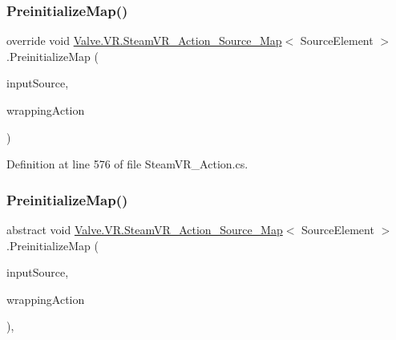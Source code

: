 \subsubsection{\texorpdfstring{PreinitializeMap()}{PreinitializeMap()}\hspace{0.1cm}{\footnotesize\ttfamily [1/2]}}
{\footnotesize\ttfamily override void \mbox{\hyperlink{class_valve_1_1_v_r_1_1_steam_v_r___action___source___map}{Valve.\+V\+R.\+Steam\+V\+R\+\_\+\+Action\+\_\+\+Source\+\_\+\+Map}}$<$ Source\+Element $>$.Preinitialize\+Map (\begin{DoxyParamCaption}\item[{\mbox{\hyperlink{namespace_valve_1_1_v_r_a82e5bf501cc3aa155444ee3f0662853f}{Steam\+V\+R\+\_\+\+Input\+\_\+\+Sources}}}]{input\+Source,  }\item[{\mbox{\hyperlink{class_valve_1_1_v_r_1_1_steam_v_r___action}{Steam\+V\+R\+\_\+\+Action}}}]{wrapping\+Action }\end{DoxyParamCaption})\hspace{0.3cm}{\ttfamily [protected]}}



Definition at line 576 of file Steam\+V\+R\+\_\+\+Action.\+cs.

\mbox{\label{class_valve_1_1_v_r_1_1_steam_v_r___action___source___map_adae017d1a61bcde0a40806b6e2251029}} 
\subsubsection{\texorpdfstring{PreinitializeMap()}{PreinitializeMap()}\hspace{0.1cm}{\footnotesize\ttfamily [2/2]}}
{\footnotesize\ttfamily abstract void \mbox{\hyperlink{class_valve_1_1_v_r_1_1_steam_v_r___action___source___map}{Valve.\+V\+R.\+Steam\+V\+R\+\_\+\+Action\+\_\+\+Source\+\_\+\+Map}}$<$ Source\+Element $>$.Preinitialize\+Map (\begin{DoxyParamCaption}\item[{\mbox{\hyperlink{namespace_valve_1_1_v_r_a82e5bf501cc3aa155444ee3f0662853f}{Steam\+V\+R\+\_\+\+Input\+\_\+\+Sources}}}]{input\+Source,  }\item[{\mbox{\hyperlink{class_valve_1_1_v_r_1_1_steam_v_r___action}{Steam\+V\+R\+\_\+\+Action}}}]{wrapping\+Action }\end{DoxyParamCaption})\hspace{0.3cm}{\ttfamily [protected]}, {}}



